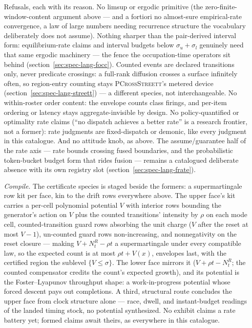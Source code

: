 Refusals, each with its reason. No limsup or ergodic primitive
(the zero-finite-window-content argument above --- and a fortiori
no almost-sure empirical-rate convergence, a law of large numbers
needing recurrence structure the vocabulary deliberately does not
assume). Nothing sharper than the pair-derived interval form:
equilibrium-rate claims and interval budgets below
$\sigma_u + \sigma_l$ genuinely need that same ergodic machinery
--- the fence the occupation-time operators sit behind
(section~\ref{sec:spec-lang-focc}). Counted events are declared
transitions only, never predicate crossings: a full-rank diffusion
crosses a surface infinitely often, so region-entry counting stays
\textsc{PCrossStreett}'s metered device
(section~\ref{sec:spec-lang-streett}) --- a different species, not
interchangeable. No within-roster order content: the envelope
counts class firings, and per-item ordering or latency stays
aggregate-invisible by design. No policy-quantified or optimality
rate claims (``no dispatch achieves a better rate'' is a research
frontier, not a former): rate judgments are fixed-dispatch or
demonic, like every judgment in this catalogue. And no attitude
knob, as above. The
assume/guarantee half of the rate axis --- rate bounds crossing
fused boundaries, and the probabilistic token-bucket budget form
that rides fusion --- remains a catalogued deliberate absence with
its own registry slot (section~\ref{sec:spec-lang-frate}).

\emph{Compile.} The certificate species is staged beside the
formers: a supermartingale row kit per face, kin to the drift rows
everywhere above. The upper face's kit carries a per-cell
polynomial potential $V$ with interior rows bounding the
generator's action on $V$ plus the counted transitions' intensity
by $\rho$ on each mode cell, counted-transition guard rows
absorbing the unit charge ($V$ after the reset at most $V - 1$),
un-counted guard rows non-increasing, and nonnegativity on the
reset closure --- making $V + N^R_t - \rho t$ a supermartingale
under every compatible law, so the expected count is at most
$\rho t + V(x)$, envelopes last, with the certified region the
sublevel $\{V \le \sigma\}$. The lower face mirrors it
($V + \rho t - N^R_t$; the counted compensator credits the count's
expected growth), and its potential is the Foster--Lyapunov
throughput shape: a work-in-progress potential whose forced
descent pays out completions. A third, structural route concludes
the upper face from clock structure alone --- race, dwell, and
instant-budget readings of the landed timing stock, no potential
synthesized. No exhibit claims a rate battery yet; formed claims
await theirs, as everywhere in this catalogue.


